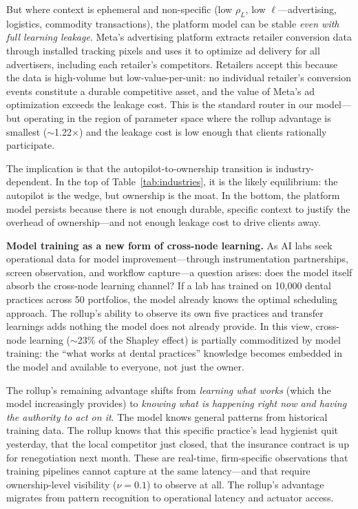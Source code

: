 \documentclass[12pt]{article}
\theoremstyle{definition}
\begin{document}
But where context is ephemeral and non-specific (low $\rho_L$, low $\ell$---advertising, logistics, commodity transactions), the platform model can be stable \textit{even with full learning leakage}. Meta's advertising platform extracts retailer conversion data through installed tracking pixels and uses it to optimize ad delivery for all advertisers, including each retailer's competitors. Retailers accept this because the data is high-volume but low-value-per-unit: no individual retailer's conversion events constitute a durable competitive asset, and the value of Meta's ad optimization exceeds the leakage cost. This is the standard router in our model---but operating in the region of parameter space where the rollup advantage is smallest ($\sim$1.22$\times$) and the leakage cost is low enough that clients rationally participate.

The implication is that the autopilot-to-ownership transition is industry-dependent. In the top of Table~\ref{tab:industries}, it is the likely equilibrium: the autopilot is the wedge, but ownership is the moat. In the bottom, the platform model persists because there is not enough durable, specific context to justify the overhead of ownership---and not enough leakage cost to drive clients away.

\textbf{Model training as a new form of cross-node learning.} As AI labs seek operational data for model improvement---through instrumentation partnerships, screen observation, and workflow capture---a question arises: does the model itself absorb the cross-node learning channel? If a lab has trained on 10,000 dental practices across 50 portfolios, the model already knows the optimal scheduling approach. The rollup's ability to observe its own five practices and transfer learnings adds nothing the model does not already provide. In this view, cross-node learning ($\sim$23\% of the Shapley effect) is partially commoditized by model training: the ``what works at dental practices'' knowledge becomes embedded in the model and available to everyone, not just the owner.

The rollup's remaining advantage shifts from \textit{learning what works} (which the model increasingly provides) to \textit{knowing what is happening right now and having the authority to act on it}. The model knows general patterns from historical training data. The rollup knows that this specific practice's lead hygienist quit yesterday, that the local competitor just closed, that the insurance contract is up for renegotiation next month. These are real-time, firm-specific observations that training pipelines cannot capture at the same latency---and that require ownership-level visibility ($\nu = 0.1$) to observe at all. The rollup's advantage migrates from pattern recognition to operational latency and actuator access.
\end{document}

